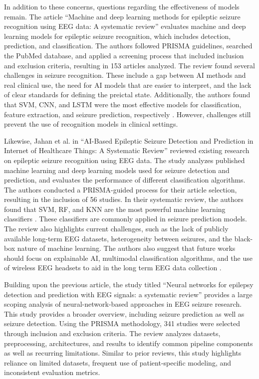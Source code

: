 \documentclass[conference]{IEEEtran}
\begin{document}
In addition to these concerns, questions regarding the effectiveness of models remain. The article “Machine and deep learning methods for epileptic seizure recognition using EEG data: A systematic review” \cite{mourad2025seizurerecognition} evaluates machine and deep learning models for epileptic seizure recognition, which includes detection, prediction, and classification. The authors followed PRISMA guidelines, searched the PubMed database, and applied a screening process that included inclusion and exclusion criteria, resulting in 153 articles analyzed. The review found several challenges in seizure recognition. These include a gap between AI methods and real clinical use, the need for AI models that are easier to interpret, and the lack of clear standards for defining the preictal state. Additionally, the authors found that SVM, CNN, and LSTM were the most effective models for classification, feature extraction, and seizure prediction, respectively \cite{mourad2025seizurerecognition}. However, challenges still prevent the use of recognition models in clinical settings.

Likewise, Jahan et al. in “AI-Based Epileptic Seizure Detection and Prediction in Internet of Healthcare Things: A Systematic Review” reviewed existing research on epileptic seizure recognition using EEG data. The study analyzes published machine learning and deep learning models used for seizure detection and prediction, and evaluates the performance of different classification algorithms. The authors conducted a PRISMA-guided process for their article selection, resulting in the inclusion of 56 studies. In their systematic review, the authors found that SVM, RF, and KNN are the most powerful machine learning classifiers \cite{sobhona2023sysreview}. These classifiers are commonly applied in seizure prediction models. The review also highlights current challenges, such as the lack of publicly available long-term EEG datasets, heterogeneity between seizures, and the black-box nature of machine learning. The authors also suggest that future works should focus on explainable AI, multimodal classification algorithms, and the use of wireless EEG headsets to aid in the long term EEG data collection \cite{sobhona2023sysreview}.

Building upon the previous article, the study titled ``Neural networks for epilepsy detection and prediction with EEG signals: a systematic review'' provides a large scoping analysis of neural-network-based approaches in EEG seizure research. This study provides a broader overview, including seizure prediction as well as seizure detection. Using the PRISMA methodology, 341 studies were selected through inclusion and exclusion criteria. The review analyzes datasets, preprocessing, architectures, and results to identify common pipeline components as well as recurring limitations. Similar to prior reviews, this study highlights reliance on limited datasets, frequent use of patient-specific modeling, and inconsistent evaluation metrics.
\end{document}
